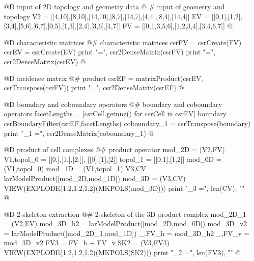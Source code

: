 \documentclass[11pt,oneside]{article}	%
\begin{document}
@D input of 2D topology and geometry data
@{
# input of geometry and topology  
V2 = [[4,10],[8,10],[14,10],[8,7],[14,7],[4,4],[8,4],[14,4]]
EV = [[0,1],[1,2],[3,4],[5,6],[6,7],[0,5],[1,3],[2,4],[3,6],[4,7]]
FV = [[0,1,3,5,6],[1,2,3,4],[3,4,6,7]]
@}

@D characteristic matrices
@{# characteristic matrices
csrFV = csrCreate(FV)
csrEV = csrCreate(EV)
print "\nFV =\n", csr2DenseMatrix(csrFV)
print "\nEV =\n", csr2DenseMatrix(csrEV)
@}

@D incidence matrix
@{# product
csrEF = matrixProduct(csrEV, csrTranspose(csrFV))
print "\nEF =\n", csr2DenseMatrix(csrEF)
@}

@D boundary and coboundary operators
@{# boundary and coboundary operators
facetLengths = [csrCell.getnnz() for csrCell in csrEV]
boundary = csrBoundaryFilter(csrEF,facetLengths)
coboundary_1 = csrTranspose(boundary)
print "\ncoboundary_1 =\n", csr2DenseMatrix(coboundary_1)
@}

@D product of cell complexes
@{# product operator
mod_2D = (V2,FV)
V1,topol_0 = [[0.],[1.],[2.]], [[0],[1],[2]]
topol_1 = [[0,1],[1,2]]
mod_0D = (V1,topol_0)
mod_1D = (V1,topol_1)
V3,CV = larModelProduct([mod_2D,mod_1D])
mod_3D = (V3,CV)
VIEW(EXPLODE(1.2,1.2,1.2)(MKPOLS(mod_3D)))
print "\nk_3 =", len(CV), "\n"
@}

@D 2-skeleton extraction
@{# 2-skeleton of the 3D product complex
mod_2D_1 = (V2,EV)
mod_3D_h2 = larModelProduct([mod_2D,mod_0D])
mod_3D_v2 = larModelProduct([mod_2D_1,mod_1D])
_,FV_h = mod_3D_h2
_,FV_v = mod_3D_v2
FV3 = FV_h + FV_v
SK2 = (V3,FV3)
VIEW(EXPLODE(1.2,1.2,1.2)(MKPOLS(SK2)))
print "\nk_2 =", len(FV3), "\n"
@}
\end{document}
